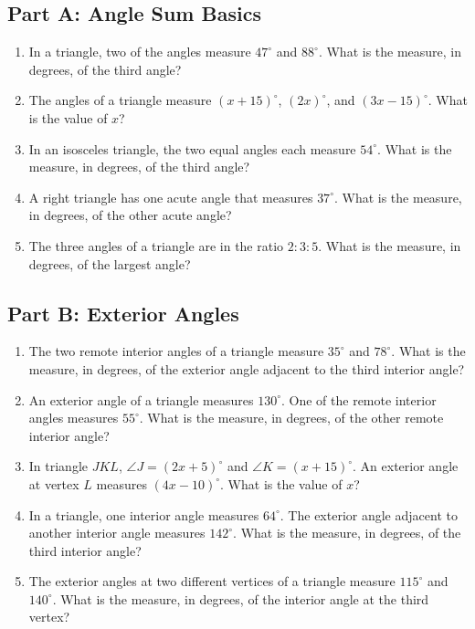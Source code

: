\documentclass[14pt]{extarticle}
\begin{document}
\subsection*{Part A: Angle Sum Basics}
\begin{enumerate}
  \item In a triangle, two of the angles measure \(47^\circ\) and \(88^\circ\). What is the measure, in degrees, of the third angle?
  \item The angles of a triangle measure \((x + 15)^\circ\), \((2x)^\circ\), and \((3x - 15)^\circ\). What is the value of \(x\)?
  \item In an isosceles triangle, the two equal angles each measure \(54^\circ\). What is the measure, in degrees, of the third angle?
  \item A right triangle has one acute angle that measures \(37^\circ\). What is the measure, in degrees, of the other acute angle?
  \item The three angles of a triangle are in the ratio \(2:3:5\). What is the measure, in degrees, of the largest angle?
\end{enumerate}

\subsection*{Part B: Exterior Angles}
\begin{enumerate}
  \item The two remote interior angles of a triangle measure \(35^\circ\) and \(78^\circ\). What is the measure, in degrees, of the exterior angle adjacent to the third interior angle?
  \item An exterior angle of a triangle measures \(130^\circ\). One of the remote interior angles measures \(55^\circ\). What is the measure, in degrees, of the other remote interior angle?
  \item In triangle \(JKL\), \(\angle J = (2x + 5)^\circ\) and \(\angle K = (x + 15)^\circ\). An exterior angle at vertex \(L\) measures \((4x - 10)^\circ\). What is the value of \(x\)?
  \item In a triangle, one interior angle measures \(64^\circ\). The exterior angle adjacent to another interior angle measures \(142^\circ\). What is the measure, in degrees, of the third interior angle?
  \item The exterior angles at two different vertices of a triangle measure \(115^\circ\) and \(140^\circ\). What is the measure, in degrees, of the interior angle at the third vertex?
\end{enumerate}
\end{document}
